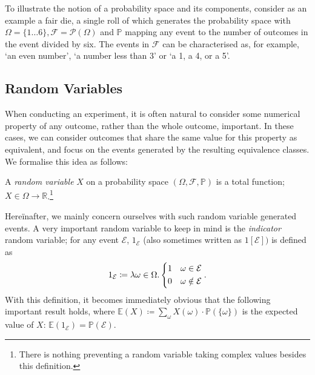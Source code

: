 		To illustrate the notion of a probability space and its components, consider as an example a fair die, a single roll 
		of which generates the probability space with $\Omega = \{1\hdots6\}, \mathcal{F} = \mathcal{P}(\Omega)$ and 
		$\mathbb{P}$ mapping any event to the number of outcomes in the event divided by six. The events in $\mathcal{F}$ can 
		be characterised as, for example, `an even  number', `a number less than 3' or `a 1, a 4, or a 5'.
	
	\subsection{Random Variables}
		When conducting an experiment, it is often natural to consider some numerical property of any outcome, rather than the
		whole outcome, important. In these cases, we can consider outcomes that share the same value for this property as equivalent,
		and focus on the events generated by the resulting equivalence classes. We formalise this idea as follows:
		\begin{definition}
			A \emph{random variable} $X$ on a probability space $(\Omega, \mathcal{F}, \mathbb{P})$ is a total function;
			$X \in \Omega \rightarrow \mathbb{R}$.\footnote{There is nothing preventing a random variable taking complex 
			values besides this definition.}
		\end{definition}
		\begin{comment}
			As mentioned, we care about events in which all outcomes that share a value under the random variable. As such, any
			random variable $X$ implicitly defines a family of events $\mathcal{E}_{X = x} \coloneqq \{\omega\in \Omega : 
			X(\omega) = x\}$ for real $x$. We will abuse notation and denote these events simply as $X = x$ for convenience,
			and use similar notation for inequalities, etc.
		\end{comment}

		Here\"inafter, we mainly concern ourselves with such random variable generated events. A very important random variable to
		keep in mind is the \emph{indicator} random variable; for any event $\mathcal{E}$, $1_{\mathcal{E}}$ (also sometimes written 
		as $1[ \mathcal{E}])$ is defined as
		$$
			1_{\mathcal{E}} \coloneqq \lambda \omega \in \Omega. 
			\begin{dcases}
				1 & \omega \in \mathcal{E} \\
				0 & \omega \notin \mathcal{E}
			\end{dcases}
			.
		$$
		With this definition, it becomes immediately obvious that the following important result holds, where 
		$\mathbb{E}(X) \coloneqq \sum_{\omega} X(\omega) \cdot \mathbb{P}(\{\omega\})$ is the expected value of $X$:
		$\mathbb{E}(1_{\mathcal{E}}) = \mathbb{P}(\mathcal{E})$.

